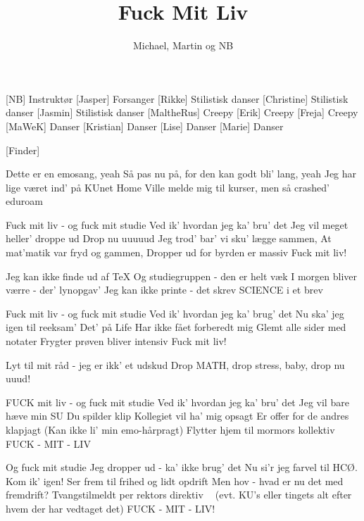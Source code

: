\documentclass[a4paper,11pt]{article}
\title{Fuck Mit Liv}
\author{Michael, Martin og NB}
\begin{document}
\maketitle

\begin{roles}
[NB] Instruktør
[Jasper] Forsanger
[Rikke] Stilistisk danser
[Christine] Stilistisk danser
[Jasmin] Stilistisk danser
[MaltheRus] Creepy
[Erik] Creepy
[Freja] Creepy
[MaWeK] Danser
[Kristian] Danser
[Lise] Danser
[Marie] Danser
\end{roles}

\begin{props}
[Finder]
\end{props}

\begin{song}
Dette er en emosang, yeah
Så pas nu på, for den kan godt bli' lang, yeah
Jeg har lige været ind' på KUnet Home
Ville melde mig til kurser, men så crashed' eduroam

Fuck mit liv - og fuck mit studie
Ved ik’ hvordan jeg ka' bru' det
Jeg vil meget heller' droppe ud
Drop nu uuuuud
Jeg trod' bar' vi sku' lægge sammen,
At mat’matik var fryd og gammen,
Dropper ud for byrden er massiv
Fuck mit liv!

Jeg kan ikke finde ud af TeX
Og studiegruppen - den er helt væk
I morgen bliver værre - der’ lynopgav'
Jeg kan ikke printe - det skrev SCIENCE i et brev

Fuck mit liv - og fuck mit studie
Ved ik' hvordan jeg ka' brug' det
Nu ska' jeg igen til reeksam’
Det' på Life
Har ikke fået forberedt mig
Glemt alle sider med notater
Frygter prøven bliver intensiv
Fuck mit liv!

Lyt til mit råd - jeg er ikk' et udskud
Drop MATH, drop stress, baby, drop nu uuud!

FUCK mit liv - og fuck mit studie
Ved ik' hvordan jeg ka' bru' det
Jeg vil bare hæve min SU
Du spilder klip
Kollegiet vil ha' mig opsagt
Er offer for de andres klapjagt (Kan ikke li’ min emo-hårpragt)
Flytter hjem til mormors kollektiv
FUCK - MIT - LIV

Og fuck mit studie
Jeg dropper ud - ka’ ikke brug’ det
Nu si’r jeg farvel til HCØ.
Kom ik’ igen!
Ser frem til frihed og lidt opdrift
Men hov - hvad er nu det med fremdrift?
Tvangstilmeldt per rektors direktiv
$~~~~$(evt. KU’s eller tingets alt efter hvem der har vedtaget det)
FUCK - MIT - LIV!
\end{song}
\end{document}
